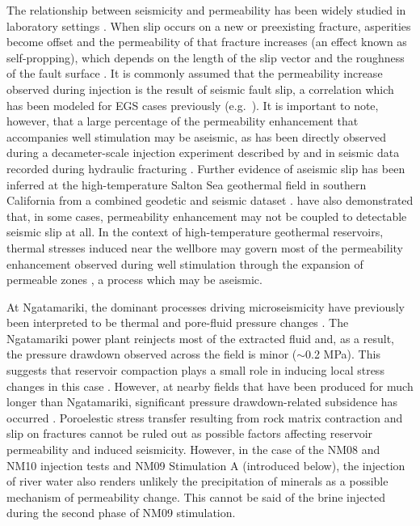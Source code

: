The relationship between seismicity and permeability has been widely studied in laboratory settings \citep[e.g.][and references therein]{Lee_2002}. When slip occurs on a new or preexisting fracture, asperities become offset and the permeability of that fracture increases (an effect known as self-propping), which depends on the length of the slip vector and the roughness of the fault surface \citep{Ishibashi_2018,Esaki_1999,Fang_2017}. It is commonly assumed that the permeability increase observed during injection is the result of seismic fault slip, a correlation which has been modeled for EGS cases previously (e.g.\ \citet{Baisch_2010}). It is important to note, however, that a large percentage of the permeability enhancement that accompanies well stimulation may be aseismic, as has been directly observed during a decameter-scale injection experiment described by \citet{Guglielmi_2015} and in seismic data recorded during hydraulic fracturing \citep{Das_2011}. Further evidence of aseismic slip has been inferred at the high-temperature Salton Sea geothermal field in southern California from a combined geodetic and seismic dataset \cite{Wei_2015}. \citet{Riffault_2018} have also demonstrated that, in some cases, permeability enhancement may not be coupled to detectable seismic slip at all. In the context of high-temperature geothermal reservoirs, thermal stresses induced near the wellbore may govern most of the permeability enhancement observed during well stimulation through the expansion of permeable zones \citep{grant2013thermal,siega_2014}, a process which may be aseismic.

At Ngatamariki, the dominant processes driving microseismicity have previously been interpreted to be thermal and pore-fluid pressure changes \citep{Sherburn_2015,grant2013thermal}. The Ngatamariki power plant reinjects most of the extracted fluid and, as a result, the pressure drawdown observed across the field is minor ($\sim$0.2 MPa). This suggests that reservoir compaction plays a small role in inducing local stress changes in this case \citep{quinao_2017}. However, at nearby fields that have been produced for much longer than Ngatamariki, significant pressure drawdown-related subsidence has occurred \citep{Allis_2000}. Poroelestic stress transfer resulting from rock matrix contraction and slip on fractures cannot be ruled out as possible factors affecting reservoir permeability and induced seismicity. However, in the case of the NM08 and NM10 injection tests and NM09 Stimulation A (introduced below), the injection of river water also renders unlikely the precipitation of minerals as a possible mechanism of permeability change. This cannot be said of the brine injected during the second phase of NM09 stimulation.

